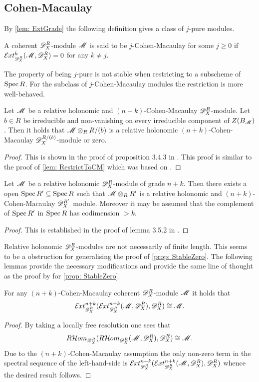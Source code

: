 \subsection{Cohen-Macaulay}
By \cref{lem: ExtGrade} the following definition gives a class of $j$-pure modules.
\begin{definition}\label{def: CohenMac}
  A coherent $\mathscr{D}_X^R$-module $\mathscr{M}$ is said to be $j$-Cohen-Macaulay for some $j\geq 0$ if $\Ex{\D_X^R}{k}(\M,\D_X^R) = 0$ for any $k\neq j$.
\end{definition}
The property of being $j$-pure is not stable when restricting to a subscheme of $\operatorname{Spec} R$.
For the subclass of $j$-Cohen-Macaulay modules the restriction is more well-behaved.
\begin{lemma}\label{lem: CMLemmaBudur}
  Let $\mathscr{M}$ be a relative holonomic and $(n+k)$-Cohen-Macaulay $\mathscr{D}_X^R$-module. Let $b\in R$ be irreducible and non-vanishing on every irreducible component of $Z(B_{\mathscr{M}})$. Then it holds that $\mathscr{M}\otimes_R R/(b)$ is a relative holonomic $(n+k)$-Cohen-Macaulay $\mathscr{D}_X^{R/(b)}$-module or zero.
\end{lemma}
\begin{proof}
  This is shown in the proof of proposition 3.4.3 in \cite{budur2019zero}. This proof is similar to the proof of \cref{lem: RestrictToCM} which was based on \cite{budur2019zero}.
\end{proof}
\begin{lemma}\label{lem: GradeToCMOverOpen}
  Let $\mathscr{M}$ be a relative holonomic $\mathscr{D}_X^R$-module of grade $n+k$. Then there exists a open $\operatorname{Spec} R' \subseteq \operatorname{Spec} R$ such that $\mathscr{M}\otimes_R R'$ is a relative holonomic and $(n+k)$-Cohen-Macaulay $\mathscr{D}_X^{R'}$ module. Moreover it may be assumed that the complement of $\operatorname{Spec} R'$ in $\operatorname{Spec} R$ has codimension $>k$.
\end{lemma}
\begin{proof}
  This is established in the proof of lemma 3.5.2 in \cite{budur2019zero}.
\end{proof}
Relative holonomic $\mathscr{D}_X^R$-modules are not necessarily of finite length.
This seems to be a obstruction for generalising the proof of \cref{prop: StableZero}.
The following lemmas provide the necessary modifications and provide the same line of thought as the proof by \cite{kashiwara1976b} for \cref{prop: StableZero}.
\begin{lemma}
  For any $(n+k)$-Cohen-Macaulay coherent $\mathscr{D}_X^R$-module $\mathscr{M}$ it holds that  $$\Ex{\D_X^R}{n+k}(\Ex{\D_X^R}{n+k}(\M,\D_X^R),\D_X^R) \cong \M.$$
\end{lemma}
\begin{proof}
  By taking a locally free resolution one sees that
  $$R\mathcal{H}om_{\mathscr{D}_X^R}(R\mathcal{H}om_{\mathscr{D}_X^R}(\mathscr{M}, \mathscr{D}_X^R),\mathscr{D}_X^R) \cong \mathscr{M}.$$
  Due to the $(n+k)$-Cohen-Macaulay assumption the only non-zero term in the spectral sequence of the left-hand-side is $\Ex{\D_X^R}{n+k}(\Ex{\D_X^R}{n+k}(\M,\D_X^R),\D_X^R)$ whence the desired result follows.
\end{proof}

